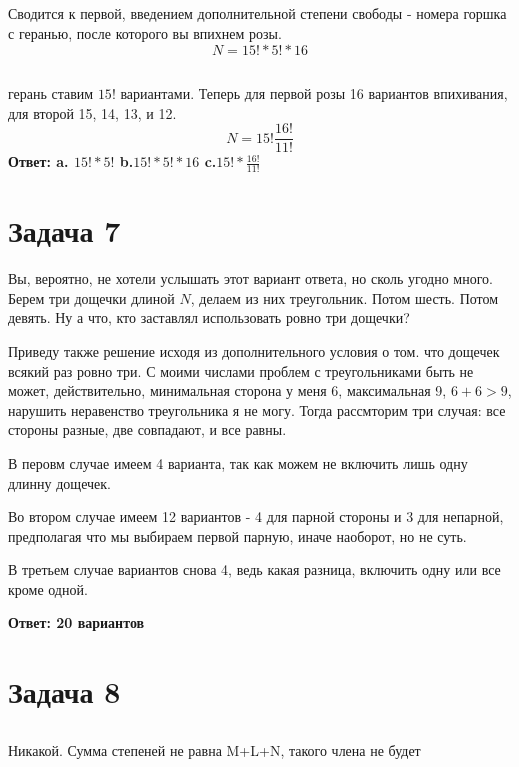 \documentclass[11pt]{article}
\begin{document}
\subsection{}
Сводится к первой, введением дополнительной степени свободы - номера горшка с геранью, после которого вы впихнем розы. 
$$N = 15!*5!*16$$
\subsection{}
герань ставим $15!$ вариантами. Теперь для первой розы 16 вариантов впихивания, для второй 15, 14, 13, и 12.
$$N=15!\frac{16!}{11!}$$
\textbf{Ответ: a. $15!*5!$ b.$15!*5!*16$ c.$15!*\frac{16!}{11!}$}

\section{Задача 7}

Вы, вероятно, не хотели услышать этот вариант ответа, но сколь угодно много. Берем три дощечки длиной $N$, делаем из них треугольник. Потом шесть. Потом девять. Ну а что, кто заставлял использовать ровно три дощечки?

Приведу также решение исходя из дополнительного условия о том. что дощечек всякий раз ровно три. С моими числами проблем с треугольниками быть не может, действительно, минимальная сторона у меня 6, максимальная 9, $6+6>9$, нарушить неравенство треугольника я не могу. Тогда рассмторим три случая: все стороны разные, две совпадают, и все равны. 

В перовм случае имеем 4 варианта, так как можем не включить лишь одну длинну дощечек. 

Во втором случае имеем 12 вариантов - 4 для парной стороны и 3 для непарной, предполагая что мы выбираем первой парную, иначе наоборот, но не суть.

В третьем случае вариантов снова 4, ведь какая разница, включить одну или все кроме одной. 

\textbf{Ответ: 20 вариантов}

\section{Задача 8}

\subsection{}

Никакой. Сумма степеней не равна M+L+N, такого члена не будет
\end{document}
